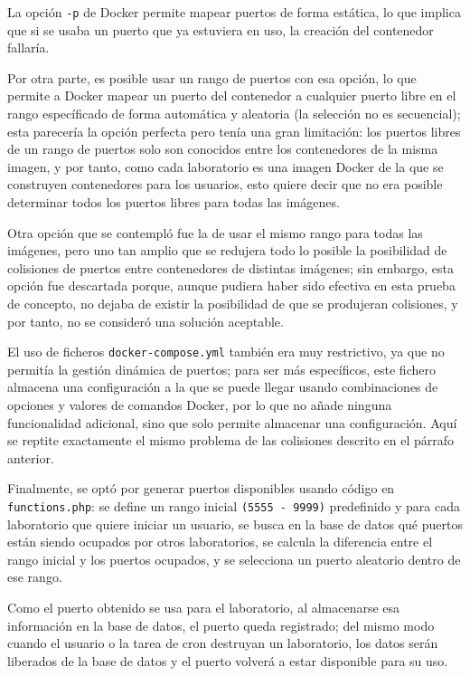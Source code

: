             La opción \texttt{-p} de Docker permite mapear puertos de forma estática, lo que implica que si se usaba un puerto que ya estuviera en uso, la creación del contenedor fallaría.
            
            Por otra parte, es posible usar un rango de puertos con esa opción, lo que permite a Docker mapear un puerto del contenedor a cualquier puerto libre en el rango específicado de forma automática y aleatoria (la selección no es secuencial); esta parecería la opción perfecta pero tenía una gran limitación: los puertos libres de un rango de puertos solo son conocidos entre los contenedores de la misma imagen, y por tanto, como cada laboratorio es una imagen Docker de la que se construyen contenedores para los usuarios, esto quiere decir que no era posible determinar todos los puertos libres para todas las imágenes.
            
            Otra opción que se contempló fue la de usar el mismo rango para todas las imágenes, pero uno tan amplio que se redujera todo lo posible la posibilidad de colisiones de puertos entre contenedores de distintas imágenes; sin embargo, esta opción fue descartada porque, aunque pudiera haber sido efectiva en esta prueba de concepto, no dejaba de existir la posibilidad de que se produjeran colisiones, y por tanto, no se consideró una solución aceptable.

            El uso de ficheros \texttt{docker-compose.yml} también era muy restrictivo, ya que no permitía la gestión dinámica de puertos; para ser más específicos, este fichero almacena una configuración a la que se puede llegar usando combinaciones de opciones y valores de comandos Docker, por lo que no añade ninguna funcionalidad adicional, sino que solo permite almacenar una configuración. Aquí se reptite exactamente el mismo problema de las colisiones descrito en el párrafo anterior.

            Finalmente, se optó por generar puertos disponibles usando código en \texttt{functions.php}: se define un rango inicial \texttt{(5555 - 9999)} predefinido y para cada laboratorio que quiere iniciar un usuario, se busca en la base de datos qué puertos están siendo ocupados por otros laboratorios, se calcula la diferencia entre el rango inicial y los puertos ocupados, y se selecciona un puerto aleatorio dentro de ese rango.

            Como el puerto obtenido se usa para el laboratorio, al almacenarse esa información en la base de datos, el puerto queda registrado; del mismo modo cuando el usuario o la tarea de cron destruyan un laboratorio, los datos serán liberados de la base de datos y el puerto volverá a estar disponible para su uso.


